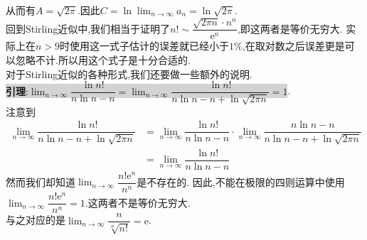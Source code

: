 \documentclass[a4paper,oneside]{ctexart}
\newcommand{\e}{\mathrm{e}}
\begin{document}
从而有$A=\sqrt{2\pi}$.因此$C=\ln{\lim_{n\to\infty}{a_n}}=\ln{\sqrt{2\pi}}$.\\
回到Stirling近似中,我们相当于证明了$n!\sim \dfrac{\sqrt{2\pi n}\cdot n^n}{\e^n}$,即这两者是等价无穷大.
实际上在$n>9$时使用这一式子估计的误差就已经小于$1\%$,在取对数之后误差更是可以忽略不计.所以用这个式子是十分合适的.\\
对于Stirling近似的各种形式,我们还要做一些额外的说明.\\
\colorbox{lightgray}{\textbf{引理}:$\lim_{n\to\infty}{\dfrac{\ln{n!}}{n\ln{n}-n}}=\lim_{n\to\infty}{\dfrac{\ln{n!}}{n\ln{n}-n+\ln{\sqrt{2\pi n}}}}=1$}.\\
注意到$$\begin{aligned}
    \lim_{n\to\infty}{\dfrac{\ln{n!}}{n\ln{n}-n+\ln{\sqrt{2\pi n}}}} &= \lim_{n\to\infty}{\dfrac{\ln{n!}}{n\ln{n}-n}}\cdot\lim_{n\to\infty}{\dfrac{n\ln{n}-n}{n\ln{n}-n+\ln{\sqrt{2\pi n}}}} \\
                                                                     &= \lim_{n\to\infty}{\dfrac{\ln{n!}}{n\ln{n}-n}}
\end{aligned}$$
然而我们却知道$\lim_{n\to\infty}{\dfrac{n!\e^n}{n^n}}$是不存在的.
因此,不能在极限的四则运算中使用$\lim_{n\to\infty}{\dfrac{n!\e^n}{n^n}}=1$.这两者不是等价无穷大.\\
与之对应的是$\lim_{n\to\infty}{\dfrac{n}{\sqrt[n]{n!}}}=\e$.
\end{document}
